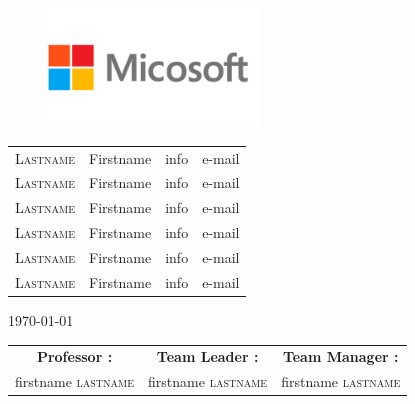 \documentclass{article} %
\begin{document}
\begin{titlepage}
\begin{sffamily}
\begin{center}
        \begin{figure}[h!]
        \centering
        \includegraphics[width=0.5\textwidth]{logo_micosoft.png}
        \end{figure}

\vspace{1cm}
\large   
    
    \begin{table}[ht!]
        \centering
        \large
             
            \begin{tabular}{lccr}
               
                \Large{\textsc{Lastname}} & \Large{Firstname} & info & e-mail\\
                \Large{\textsc{Lastname}} & \Large{Firstname} & info & e-mail\\
                \Large{\textsc{Lastname}} & \Large{Firstname} & info & e-mail\\
                \Large{\textsc{Lastname}} & \Large{Firstname} & info & e-mail\\
                \Large{\textsc{Lastname}} & \Large{Firstname} & info & e-mail\\
                \Large{\textsc{Lastname}} & \Large{Firstname} & info & e-mail\\

            \end{tabular}
    \end{table}
\vspace{1cm}
    \begin{center}
        {\rm \today}
    \end{center}
    
    
\vfill

\begin{tabular}{c c c}
    \textrm{\textbf{Professor :}} & \textrm{\textbf{Team Leader :}} &\textrm{\textbf{Team Manager :}}\\
    \textrm{firstname \textsc{lastname}} & \textrm{firstname \textsc{lastname}} & \textrm{firstname \textsc{lastname}}
\end{tabular}
    
\end{center}
\end{sffamily}
\end{titlepage}
\end{document}
